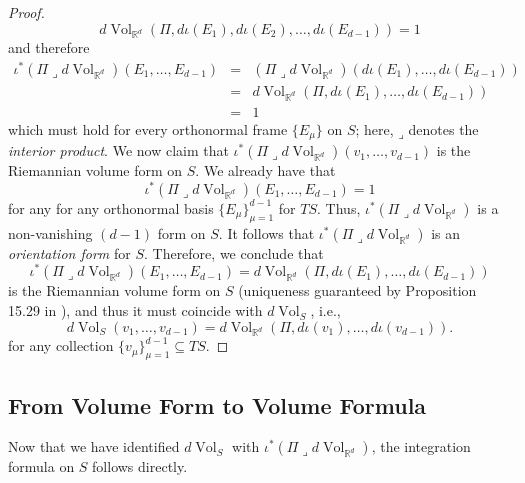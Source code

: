 \documentclass{article}
\newcommand{\R}{\mathbb{R}}
\newcommand{\iprod}{\mathbin{\lrcorner}}
\theoremstyle{theorem}
\newcommand{\Vol}{\operatorname{Vol}}
\begin{document}
\begin{proof}
\begin{equation*}
    d\Vol_{\R^d}(\Pi,d\iota(E_1),d\iota(E_2),\dots,d\iota(E_{d-1})) = 1
\end{equation*}
and therefore
\begin{eqnarray*}
     \iota^* (\Pi  \iprod d\Vol_{\R^d})(E_1,\dots, E_{d-1})&=& (\Pi  \iprod d\Vol_{\R^d})(d\iota(E_1),\dots, d\iota(E_{d-1})) \\
     &=& d\Vol_{\R^d}(\Pi, d\iota(E_1),\dots, d\iota(E_{d-1})) \\
    &=& 1
\end{eqnarray*}
which must hold for every orthonormal frame $\{E_\mu\}$ on $S$; here, $\iprod$ denotes the \textit{interior product}. We now claim that $\iota^* (\Pi \iprod  d\Vol_{\R^d})(v_1,\dots, v_{d-1})$ is the Riemannian volume form on $S$. We already have that
\begin{equation*}
    \iota^* (\Pi  \iprod d\Vol_{\R^d})(E_1,\dots, E_{d-1}) = 1
\end{equation*}
for any for any orthonormal basis $\{ E_{\mu} \}_{\mu=1}^{d-1}$ for $T S$. Thus, $\iota^* (\Pi  \iprod d\Vol_{\R^d})$ is a non-vanishing $(d-1)$ form on $S$. It follows that $\iota^* (\Pi  \iprod d\Vol_{\R^d})$ is an \textit{orientation form} for $S$. Therefore, we conclude that 
\begin{equation*}
    \iota^* (\Pi  \iprod d\Vol_{\R^d})(E_1,\dots, E_{d-1}) = d\Vol_{\R^d}(\Pi, d\iota(E_1),\dots, d\iota(E_{d-1}))
\end{equation*}
is the Riemannian volume form on $S$ (uniqueness guaranteed by Proposition 15.29 in \cite{lee2013smooth}), and thus it must coincide with  $d\Vol_S$, i.e.,
\begin{equation*}
    d\Vol_S(v_1,\dots, v_{d-1}) = d\Vol_{\R^d}(\Pi, d\iota(v_1),\dots, d\iota(v_{d-1})).
\end{equation*}
for any collection $\{v_\mu\}_{\mu=1}^{d-1} \subseteq TS$. 
\end{proof}


\subsection{From Volume Form to Volume Formula}

Now that we have identified $d\Vol_S$ with $\iota^*(\Pi \iprod d\Vol_{\R^d})$, the integration formula on $S$ follows directly. 
\end{document}
